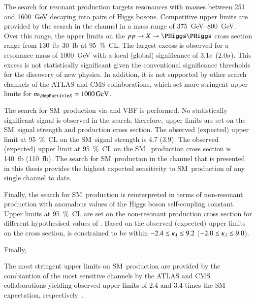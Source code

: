The search for resonant \HH production targets resonances with masses between
\num{251} and \SI{1600}{\GeV} decaying into pairs of Higgs bosons. Competitive
upper limits are provided by the search in the \bbtautau channel in a mass range
of \SIrange{375}{800}{\GeV}. Over this range, the upper limits on the
$pp \to X \to \HH$ cross section range from \SIrange{130}{30}{\femto\barn} at
\SI{95}{\percent}~CL. The largest excess is observed for a resonance mass of
\SI{1000}{\GeV} with a local (global) significance of $3.1\sigma$
($2.0\sigma$). This excess is not statistically significant given the
conventional significance thresholds for the discovery of new physics. In
addition, it is not supported by other search channels of the ATLAS and CMS
collaborations, which set more stringent upper limits for
$\mX = \SI{1000}{\GeV}$.


The search for SM~\HH production via \ggF and VBF is performed. No statistically
significant signal is observed in the search; therefore, upper limits are set on
the SM~\HH signal strength and production cross section. The observed (expected)
upper limit at \SI{95}{\percent}~CL on the SM~\HH signal strength is 4.7 (3.9).
The observed (expected) upper limit at \SI{95}{\percent}~CL on the SM~\HH
production cross section is \SI{140}{\femto\barn} (\SI{110}{\femto\barn}). The
search for SM~\HH production in the \bbtautau channel that is presented in this
thesis provides the highest expected sensitivity to SM~\HH production of any
single channel to date.


Finally, the search for SM~\HH production is reinterpreted in terms of
non-resonant \HH production with anomalous values of the Higgs boson
self-coupling constant. Upper limits at \SI{95}{\percent}~CL are set on the
non-resonant \HH production cross section for different hypothesised values of
\klambda. Based on the observed (expected) upper limits on the cross section,
\klambda is constrained to be within $-2.4 \leq \kappa_{\lambda} \leq 9.2$
($-2.0 \leq \kappa_{\lambda} \leq 9.0$).




Finally,





The most stringent upper limits on SM~\HH production are provided by the
combiantion of the most sensitive channels by the ATLAS and CMS collaborations
yielding observed upper limits of 2.4 and 3.4 times the SM expectation,
respectively~\cite{}.



